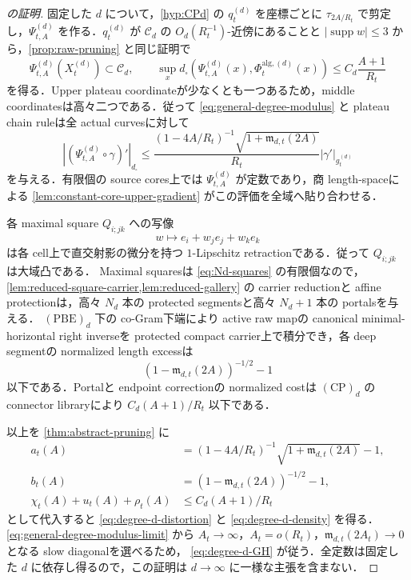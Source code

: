 \documentclass[a4paper,11pt]{ltjsarticle}
\numberwithin{equation}{section}
\theoremstyle{plain}
\theoremstyle{definition}
\theoremstyle{remark}
\newcommand{\supp}{\operatorname{supp}}
\newcommand{\Cd}{\mathcal C_d}
\begin{document}
\begin{proof}[ の証明]
固定した $d$ について，\cref{hyp:CPd} の $q_t^{(d)}$ を座標ごとに
$\tau_{2A/R_t}$ で剪定し，$\Psi_{t,A}^{(d)}$ を作る．$q_t^{(d)}$ が $\Cd$ の
$O_d(R_t^{-1})$-近傍にあることと $|\supp w|\le3$ から，\cref{prop:raw-pruning} と同じ証明で
\[
 \Psi_{t,A}^{(d)}(X_t^{(d)})\subset\Cd,
 \qquad
 \sup_xd_\square(\Psi_{t,A}^{(d)}(x),\Phi_t^{\mathrm{alg},(d)}(x))
 \le C_d\frac{A+1}{R_t}
\]
を得る．Upper plateau coordinateが少なくとも一つあるため，middle coordinatesは高々二つである．従って
\eqref{eq:general-degree-modulus} と plateau chain ruleは全 actual curvesに対して
\[
 |(\Psi_{t,A}^{(d)}\circ\gamma)'|_{d_\square}
 \le \frac{(1-4A/R_t)^{-1}\sqrt{1+\mathfrak m_{d,t}(2A)}}{R_t}
 |\gamma'|_{g_t^{(d)}}
\]
を与える．有限個の source cores上では $\Psi_{t,A}^{(d)}$ が定数であり，商 length-spaceによる
\cref{lem:constant-core-upper-gradient} がこの評価を全域へ貼り合わせる．

各 maximal square $Q_{i;jk}$ への写像
\[
 w\longmapsto e_i+w_je_j+w_ke_k
\]
は各 cell上で直交射影の微分を持つ $1$-Lipschitz retractionである．従って $Q_{i;jk}$ は大域凸である．
Maximal squaresは \eqref{eq:Nd-squares} の有限個なので，\cref{lem:reduced-square-carrier,lem:reduced-gallery} の
carrier reductionと affine protectionは，高々 $N_d$ 本の protected segmentsと高々 $N_d+1$ 本の portalsを与える．
$\mathrm{(PBE)}_d$ 下の co-Gram下端により active raw mapの canonical minimal-horizontal right inverseを protected compact carrier上で積分でき，各 deep segmentの normalized length excessは
\[
 (1-\mathfrak m_{d,t}(2A))^{-1/2}-1
\]
以下である．Portalと endpoint correctionの normalized costは $\mathrm{(CP)}_d$ の connector libraryにより
$C_d(A+1)/R_t$ 以下である．

以上を \cref{thm:abstract-pruning} に
\begin{align*}
 a_t(A)&=(1-4A/R_t)^{-1}\sqrt{1+\mathfrak m_{d,t}(2A)}-1,\\
 b_t(A)&=(1-\mathfrak m_{d,t}(2A))^{-1/2}-1,\\
 \chi_t(A)+u_t(A)+\rho_t(A)&\le C_d(A+1)/R_t
\end{align*}
として代入すると \eqref{eq:degree-d-distortion} と
\eqref{eq:degree-d-density} を得る．
\eqref{eq:general-degree-modulus-limit} から
$A_t\to\infty$，$A_t=o(R_t)$，$\mathfrak m_{d,t}(2A_t)\to0$ となる slow diagonalを選べるため，
\eqref{eq:degree-d-GH} が従う．全定数は固定した $d$ に依存し得るので，この証明は $d\to\infty$ に一様な主張を含まない．
\end{proof}
\end{document}
